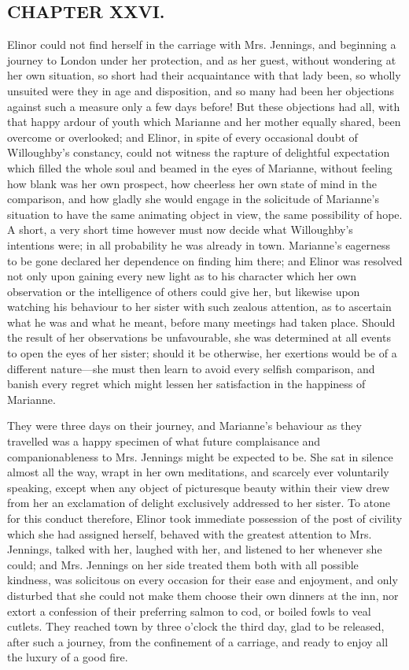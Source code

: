 \subsection[chapter-xxvi.]{\useURL[url26][][][]\from[url26]CHAPTER XXVI.}

Elinor could not find herself in the carriage with Mrs. Jennings, and beginning a journey to London under her protection, and as her guest, without wondering at her own situation, so short had their acquaintance with that lady been, so wholly unsuited were they in age and disposition, and so many had been her objections against such a measure only a few days before! But these objections had all, with that happy ardour of youth which Marianne and her mother equally shared, been overcome or overlooked; and Elinor, in spite of every occasional doubt of Willoughby's constancy, could not witness the rapture of delightful expectation which filled the whole soul and beamed in the eyes of Marianne, without feeling how blank was her own prospect, how cheerless her own state of mind in the comparison, and how gladly she would engage in the solicitude of Marianne's situation to have the same animating object in view, the same possibility of hope. A short, a very short time however must now decide what Willoughby's intentions were; in all probability he was already in town. Marianne's eagerness to be gone declared her dependence on finding him there; and Elinor was resolved not only upon gaining every new light as to his character which her own observation or the intelligence of others could give her, but likewise upon watching his behaviour to her sister with such zealous attention, as to ascertain what he was and what he meant, before many meetings had taken place. Should the result of her observations be unfavourable, she was determined at all events to open the eyes of her sister; should it be otherwise, her exertions would be of a different nature---she must then learn to avoid every selfish comparison, and banish every regret which might lessen her satisfaction in the happiness of Marianne.

They were three days on their journey, and Marianne's behaviour as they travelled was a happy specimen of what future complaisance and companionableness to Mrs. Jennings might be expected to be. She sat in silence almost all the way, wrapt in her own meditations, and scarcely ever voluntarily speaking, except when any object of picturesque beauty within their view drew from her an exclamation of delight exclusively addressed to her sister. To atone for this conduct therefore, Elinor took immediate possession of the post of civility which she had assigned herself, behaved with the greatest attention to Mrs. Jennings, talked with her, laughed with her, and listened to her whenever she could; and Mrs. Jennings on her side treated them both with all possible kindness, was solicitous on every occasion for their ease and enjoyment, and only disturbed that she could not make them choose their own dinners at the inn, nor extort a confession of their preferring salmon to cod, or boiled fowls to veal cutlets. They reached town by three o'clock the third day, glad to be released, after such a journey, from the confinement of a carriage, and ready to enjoy all the luxury of a good fire.

